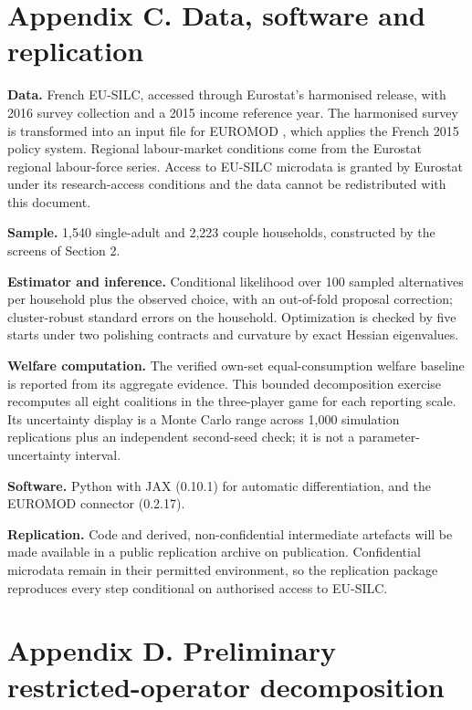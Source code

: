 \documentclass[11pt,a4paper]{article}
\begin{document}
\section{Appendix C. Data, software and replication}\label{appendix-c.-data-software-and-replication}

\textbf{Data.} French EU-SILC, accessed through Eurostat's harmonised release, with 2016 survey collection and a 2015 income reference year. The harmonised survey is transformed into an input file for EUROMOD \citep{sutherlandfigari2013}, which applies the French 2015 policy system. Regional labour-market conditions come from the Eurostat regional labour-force series. Access to EU-SILC microdata is granted by Eurostat under its research-access conditions and the data cannot be redistributed with this document.

\textbf{Sample.} 1,540 single-adult and 2,223 couple households, constructed by the screens of Section 2.

\textbf{Estimator and inference.} Conditional likelihood over 100 sampled alternatives per household plus the observed choice, with an out-of-fold proposal correction; cluster-robust standard errors on the household. Optimization is checked by five starts under two polishing contracts and curvature by exact Hessian eigenvalues.

\textbf{Welfare computation.} The verified own-set equal-consumption welfare baseline is reported from its aggregate evidence. This bounded decomposition exercise recomputes all eight coalitions in the three-player game for each reporting scale. Its uncertainty display is a Monte Carlo range across 1,000 simulation replications plus an independent second-seed check; it is not a parameter-uncertainty interval.

\textbf{Software.} Python with JAX (0.10.1) for automatic differentiation, and the EUROMOD connector (0.2.17).

\textbf{Replication.} Code and derived, non-confidential intermediate artefacts will be made available in a public replication archive on publication. Confidential microdata remain in their permitted environment, so the replication package reproduces every step conditional on authorised access to EU-SILC.

\section{Appendix D. Preliminary restricted-operator decomposition}\label{appendix-d.-preliminary-restricted-operator-decomposition}
\end{document}
